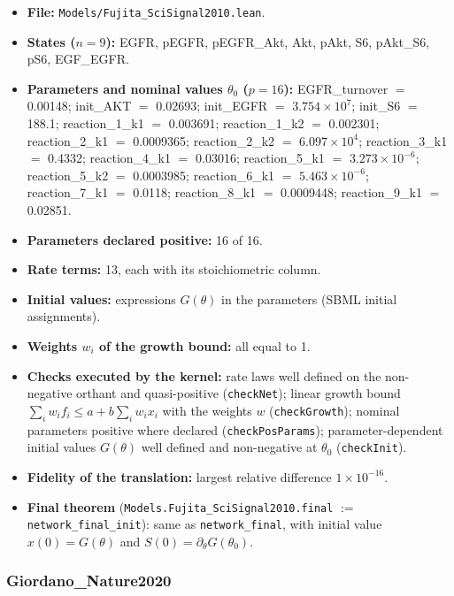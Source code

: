 \begin{itemize}\itemsep0pt\small
\item \textbf{File:} \texttt{Models/Fujita\_SciSignal2010.lean}.
\item \textbf{States ($n=9$):} EGFR, pEGFR, pEGFR\_Akt, Akt, pAkt, S6, pAkt\_S6, pS6, EGF\_EGFR.
\item \textbf{Parameters and nominal values $\theta_0$ ($p=16$):} EGFR\_turnover $=$ 0.00148; init\_AKT $=$ 0.02693; init\_EGFR $=$ $3.754\times10^{7}$; init\_S6 $=$ 188.1; reaction\_1\_k1 $=$ 0.003691; reaction\_1\_k2 $=$ 0.002301; reaction\_2\_k1 $=$ 0.0009365; reaction\_2\_k2 $=$ $6.097\times10^{4}$; reaction\_3\_k1 $=$ 0.4332; reaction\_4\_k1 $=$ 0.03016; reaction\_5\_k1 $=$ $3.273\times10^{-6}$; reaction\_5\_k2 $=$ 0.0003985; reaction\_6\_k1 $=$ $5.463\times10^{-6}$; reaction\_7\_k1 $=$ 0.0118; reaction\_8\_k1 $=$ 0.0009448; reaction\_9\_k1 $=$ 0.02851.
\item \textbf{Parameters declared positive:} 16 of 16.
\item \textbf{Rate terms:} 13, each with its stoichiometric column.
\item \textbf{Initial values:} expressions $G(\theta)$ in the parameters (SBML initial assignments).
\item \textbf{Weights $w_i$ of the growth bound:} all equal to 1.
\item \textbf{Checks executed by the kernel:} rate laws well defined on the non-negative orthant and quasi-positive (\texttt{checkNet}); linear growth bound $\sum_iw_if_i\le a+b\sum_iw_ix_i$ with the weights $w$ (\texttt{checkGrowth}); nominal parameters positive where declared (\texttt{checkPosParams}); parameter-dependent initial values $G(\theta)$ well defined and non-negative at $\theta_0$ (\texttt{checkInit}).
\item \textbf{Fidelity of the translation:} largest relative difference $1\times10^{-16}$.
\item \textbf{Final theorem} (\texttt{Models.Fujita\_SciSignal2010.final} $:=$ \texttt{network\_final\_init}): same as \texttt{network\_final}, with initial value $x(0)=G(\theta)$ and $S(0)=\partial_\theta G(\theta_0)$.
\end{itemize}

\subsubsection*{Giordano\_Nature2020}

